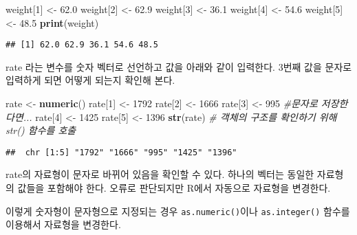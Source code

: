 \documentclass[
]{article}
\newenvironment{Shaded}{\begin{snugshade}}{\end{snugshade}}
\newcommand{\CommentTok}[1]{\textcolor[rgb]{0.56,0.35,0.01}{\textit{#1}}}
\newcommand{\DecValTok}[1]{\textcolor[rgb]{0.00,0.00,0.81}{#1}}
\newcommand{\FloatTok}[1]{\textcolor[rgb]{0.00,0.00,0.81}{#1}}
\newcommand{\FunctionTok}[1]{\textcolor[rgb]{0.13,0.29,0.53}{\textbf{#1}}}
\newcommand{\NormalTok}[1]{#1}
\newcommand{\OtherTok}[1]{\textcolor[rgb]{0.56,0.35,0.01}{#1}}
\newcommand{\StringTok}[1]{\textcolor[rgb]{0.31,0.60,0.02}{#1}}
\begin{document}
\begin{Shaded}
\begin{Highlighting}[]
\NormalTok{weight[}\DecValTok{1}\NormalTok{] }\OtherTok{\textless{}{-}} \FloatTok{62.0}
\NormalTok{weight[}\DecValTok{2}\NormalTok{] }\OtherTok{\textless{}{-}} \FloatTok{62.9}
\NormalTok{weight[}\DecValTok{3}\NormalTok{] }\OtherTok{\textless{}{-}} \FloatTok{36.1}
\NormalTok{weight[}\DecValTok{4}\NormalTok{] }\OtherTok{\textless{}{-}} \FloatTok{54.6}
\NormalTok{weight[}\DecValTok{5}\NormalTok{] }\OtherTok{\textless{}{-}} \FloatTok{48.5}
\FunctionTok{print}\NormalTok{(weight)}
\end{Highlighting}
\end{Shaded}

\begin{verbatim}
## [1] 62.0 62.9 36.1 54.6 48.5
\end{verbatim}

rate 라는 변수를 숫자 벡터로 선언하고 값을 아래와 같이 입력한다. 3번째
값을 문자로 입력하게 되면 어떻게 되는지 확인해 본다.

\begin{Shaded}
\begin{Highlighting}[]
\NormalTok{rate }\OtherTok{\textless{}{-}} \FunctionTok{numeric}\NormalTok{()}
\NormalTok{rate[}\DecValTok{1}\NormalTok{] }\OtherTok{\textless{}{-}} \DecValTok{1792}
\NormalTok{rate[}\DecValTok{2}\NormalTok{] }\OtherTok{\textless{}{-}} \DecValTok{1666}
\NormalTok{rate[}\DecValTok{3}\NormalTok{] }\OtherTok{\textless{}{-}} \StringTok{\textquotesingle{}995\textquotesingle{}} \CommentTok{\#문자로 저장한다면...}
\NormalTok{rate[}\DecValTok{4}\NormalTok{] }\OtherTok{\textless{}{-}} \DecValTok{1425}
\NormalTok{rate[}\DecValTok{5}\NormalTok{] }\OtherTok{\textless{}{-}} \DecValTok{1396}
\FunctionTok{str}\NormalTok{(rate) }\CommentTok{\# 객체의 구조를 확인하기 위해 str() 함수를 호출}
\end{Highlighting}
\end{Shaded}

\begin{verbatim}
##  chr [1:5] "1792" "1666" "995" "1425" "1396"
\end{verbatim}

rate의 자료형이 문자로 바뀌어 있음을 확인할 수 있다. 하나의 벡터는
동일한 자료형의 값들을 포함해야 한다. 오류로 판단되지만 R에서 자동으로
자료형을 변경한다.

이렇게 숫자형이 문자형으로 지정되는 경우 \texttt{as.numeric()}이나
\texttt{as.integer()} 함수를 이용해서 자료형을 변경한다.
\end{document}
